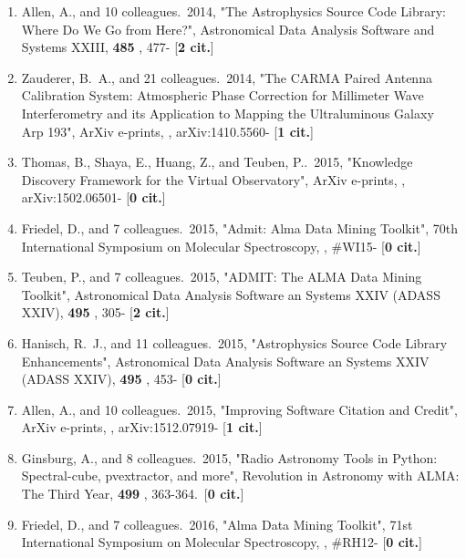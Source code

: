 \documentclass[11pt,letterpaper]{article}
\begin{document}
\begin{enumerate}[resume,label=\textbf{\arabic*}.]
\item  
Allen, A., and 10 colleagues.\  2014,  "The Astrophysics Source Code 
Library: Where Do We Go from Here?", Astronomical Data Analysis Software 
and Systems XXIII,  {\bf 485} , 477- [{\bf 2 cit.}] 

\item  
Zauderer, B.~A., and 21 colleagues.\  2014,  "The CARMA Paired Antenna 
Calibration System: Atmospheric Phase Correction for Millimeter Wave 
Interferometry and its Application to Mapping the Ultraluminous Galaxy Arp 
193", ArXiv e-prints,  , arXiv:1410.5560- [{\bf 1 cit.}] 


\item  
Thomas, B., Shaya, E., Huang, Z., and Teuben, P..\  2015,  "Knowledge 
Discovery Framework for the Virtual Observatory", ArXiv e-prints,  , 
arXiv:1502.06501- [{\bf 0 cit.}] 


\item  
Friedel, D., and 7 colleagues.\  2015,  "Admit: Alma Data Mining Toolkit", 
70th International Symposium on Molecular Spectroscopy,  , \#WI15- [{\bf 0 
cit.}] 

\item  
Teuben, P., and 7 colleagues.\  2015,  "ADMIT: The ALMA Data Mining 
Toolkit", Astronomical Data Analysis Software an Systems XXIV (ADASS XXIV),  
{\bf 495} , 305- [{\bf 2 cit.}] 

\item  
Hanisch, R.~J., and 11 colleagues.\  2015,  "Astrophysics Source Code 
Library Enhancements", Astronomical Data Analysis Software an Systems XXIV 
(ADASS XXIV),  {\bf 495} , 453- [{\bf 0 cit.}] 

\item  
Allen, A., and 10 colleagues.\  2015,  "Improving Software Citation and 
Credit", ArXiv e-prints,  , arXiv:1512.07919- [{\bf 1 cit.}] 

\item  
Ginsburg, A., and 8 colleagues.\  2015,  "Radio Astronomy Tools in Python: 
Spectral-cube, pvextractor, and more", Revolution in Astronomy with ALMA: 
The Third Year,  {\bf 499} , 363-364.\  [{\bf 0 cit.}] 


\item  
Friedel, D., and 7 colleagues.\  2016,  "Alma Data Mining Toolkit", 71st 
International Symposium on Molecular Spectroscopy,  , \#RH12- [{\bf 0 
cit.}] 


\end{enumerate}
\end{document}
